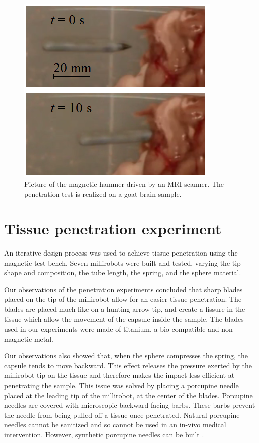 \documentclass[letterpaper, 10 pt, conference]{ieeeconf}  %
\begin{document}
\begin{figure}
\centering
  \includegraphics[width=120 pt]{tests_in_MRI.png}
  \caption{Picture of the magnetic hammer driven by an MRI scanner. The penetration test is realized on a goat brain sample.}
  \label{MRI_test}
	\vspace{-2em}
\end{figure}

\section{Tissue penetration experiment}

An iterative design process was used to achieve tissue penetration using the magnetic test bench. Seven millirobots were built and tested, varying the tip shape and composition, the tube length, the spring, and the sphere material. \par
Our observations of the penetration experiments concluded that sharp blades placed on the tip of the millirobot allow for an easier tissue penetration. The blades are placed much like on a hunting arrow tip, and create a fissure in the tissue which allow the movement of the capsule inside the sample. The blades used in our experiments were made of titanium, a bio-compatible and non-magnetic metal.\par
Our observations also showed that, when the sphere compresses the spring, the capsule tends to move backward. This effect releases the pressure exerted by the millirobot tip on the tissue and therefore makes the impact less efficient at penetrating the sample. This issue was solved by placing a porcupine needle placed at the leading tip of the millirobot, at the center of the blades. Porcupine needles are covered with microscopic backward facing barbs. These barbs prevent the needle from being pulled off a tissue once penetrated. Natural porcupine needles cannot be sanitized and so cannot be used in an in-vivo medical intervention. However, synthetic porcupine needles can be built \cite{cho2012microstructured}.\par
\end{document}
